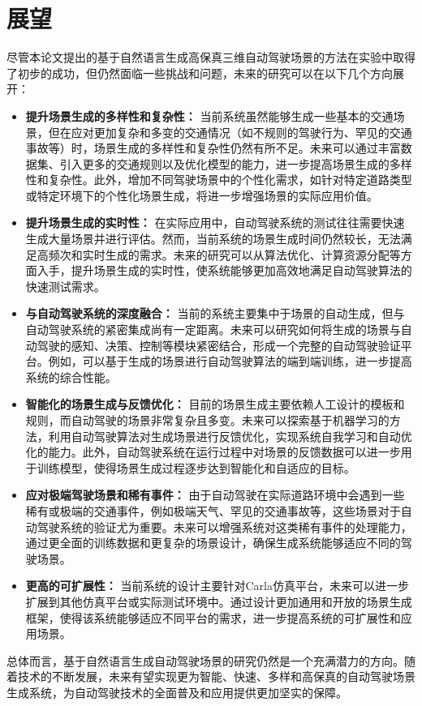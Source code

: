 \section{展望}

尽管本论文提出的基于自然语言生成高保真三维自动驾驶场景的方法在实验中取得了初步的成功，但仍然面临一些挑战和问题，未来的研究可以在以下几个方向展开：

\begin{itemize}
	\item \textbf{提升场景生成的多样性和复杂性：} 当前系统虽然能够生成一些基本的交通场景，但在应对更加复杂和多变的交通情况（如不规则的驾驶行为、罕见的交通事故等）时，场景生成的多样性和复杂性仍然有所不足。未来可以通过丰富数据集、引入更多的交通规则以及优化模型的能力，进一步提高场景生成的多样性和复杂性。此外，增加不同驾驶场景中的个性化需求，如针对特定道路类型或特定环境下的个性化场景生成，将进一步增强场景的实际应用价值。
	
	\item \textbf{提升场景生成的实时性：} 在实际应用中，自动驾驶系统的测试往往需要快速生成大量场景并进行评估。然而，当前系统的场景生成时间仍然较长，无法满足高频次和实时生成的需求。未来的研究可以从算法优化、计算资源分配等方面入手，提升场景生成的实时性，使系统能够更加高效地满足自动驾驶算法的快速测试需求。
	
	\item \textbf{与自动驾驶系统的深度融合：} 当前的系统主要集中于场景的自动生成，但与自动驾驶系统的紧密集成尚有一定距离。未来可以研究如何将生成的场景与自动驾驶的感知、决策、控制等模块紧密结合，形成一个完整的自动驾驶验证平台。例如，可以基于生成的场景进行自动驾驶算法的端到端训练，进一步提高系统的综合性能。
	
	\item \textbf{智能化的场景生成与反馈优化：} 目前的场景生成主要依赖人工设计的模板和规则，而自动驾驶的场景非常复杂且多变。未来可以探索基于机器学习的方法，利用自动驾驶算法对生成场景进行反馈优化，实现系统自我学习和自动优化的能力。此外，自动驾驶系统在运行过程中对场景的反馈数据可以进一步用于训练模型，使得场景生成过程逐步达到智能化和自适应的目标。
	
	\item \textbf{应对极端驾驶场景和稀有事件：} 由于自动驾驶在实际道路环境中会遇到一些稀有或极端的交通事件，例如极端天气、罕见的交通事故等，这些场景对于自动驾驶系统的验证尤为重要。未来可以增强系统对这类稀有事件的处理能力，通过更全面的训练数据和更复杂的场景设计，确保生成系统能够适应不同的驾驶场景。
	
	\item \textbf{更高的可扩展性：} 当前系统的设计主要针对Carla仿真平台，未来可以进一步扩展到其他仿真平台或实际测试环境中。通过设计更加通用和开放的场景生成框架，使得该系统能够适应不同平台的需求，进一步提高系统的可扩展性和应用场景。
\end{itemize}

总体而言，基于自然语言生成自动驾驶场景的研究仍然是一个充满潜力的方向。随着技术的不断发展，未来有望实现更为智能、快速、多样和高保真的自动驾驶场景生成系统，为自动驾驶技术的全面普及和应用提供更加坚实的保障。


